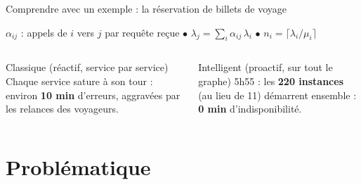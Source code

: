 \documentclass[aspectratio=169,10pt]{beamer}
\begin{document}
\begin{frame}{Comprendre avec un exemple : la réservation de billets de voyage}
\begin{center}
{}
  \end{center}

  \vspace{-0.1cm}
  {\scriptsize $\alpha_{ij}$ : appels de $i$ vers $j$ par requête reçue \quad $\bullet$ \quad $\lambda_j = \sum_i \alpha_{ij}\,\lambda_i$ \quad $\bullet$ \quad $n_i = \lceil \lambda_i / \mu_i \rceil$\par}

  \vspace{0.05cm}
  \begin{columns}[T]
    \begin{alertblock}{Classique (réactif, service par service)}
      \scriptsize Chaque service sature à son tour : environ \textbf{10 min} d'erreurs, aggravées par les relances des voyageurs.
    \end{alertblock}
    \begin{block}{Intelligent (proactif, sur tout le graphe)}
      \scriptsize 5h55 : les \textbf{220 instances} (au lieu de 11) démarrent ensemble : \textbf{0 min} d'indisponibilité.
    \end{block}
  \end{columns}
\end{frame}

\section{Problématique}
\end{document}
